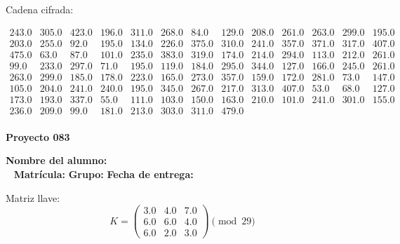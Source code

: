 \documentclass[12pt]{article}
\begin{document}
Cadena cifrada:
\begin{center}
$\begin{array}{lllllllllllll}
243.0 & 305.0 & 423.0 & 196.0 & 311.0 & 268.0 & 84.0 & 129.0 & 208.0 & 261.0 & 263.0 & 299.0 & 195.0\\
203.0 & 255.0 & 92.0 & 195.0 & 134.0 & 226.0 & 375.0 & 310.0 & 241.0 & 357.0 & 371.0 & 317.0 & 407.0\\
475.0 & 63.0 & 87.0 & 101.0 & 235.0 & 383.0 & 319.0 & 174.0 & 214.0 & 294.0 & 113.0 & 212.0 & 261.0\\
99.0 & 233.0 & 297.0 & 71.0 & 195.0 & 119.0 & 184.0 & 295.0 & 344.0 & 127.0 & 166.0 & 245.0 & 261.0\\
263.0 & 299.0 & 185.0 & 178.0 & 223.0 & 165.0 & 273.0 & 357.0 & 159.0 & 172.0 & 281.0 & 73.0 & 147.0\\
105.0 & 204.0 & 241.0 & 240.0 & 195.0 & 345.0 & 267.0 & 217.0 & 313.0 & 407.0 & 53.0 & 68.0 & 127.0\\
173.0 & 193.0 & 337.0 & 55.0 & 111.0 & 103.0 & 150.0 & 163.0 & 210.0 & 101.0 & 241.0 & 301.0 & 155.0\\
236.0 & 209.0 & 99.0 & 181.0 & 213.0 & 303.0 & 311.0 & 479.0\\
\end{array}$
\end{center}

\newpage


\textbf{Proyecto 083}

\textbf{Nombre del alumno:} \underline{\hspace{13cm}}\\\
\vspace{1cm}
\textbf{Matrícula:} \underline{\hspace{4cm}} \hspace{1cm}
\textbf{Grupo:} \underline{\hspace{2cm}}
\textbf{Fecha de entrega:} \underline{\hspace{2cm}}

\medskip

Matriz llave:
\[
K = \begin{pmatrix}
3.0 & 4.0 & 7.0\\
6.0 & 6.0 & 4.0\\
6.0 & 2.0 & 3.0
\end{pmatrix} \pmod{29}
\]
\end{document}
